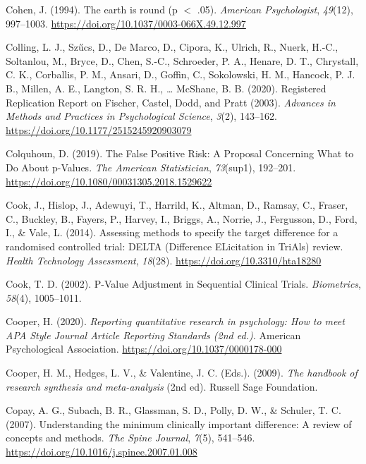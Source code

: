\documentclass[
  oneside]{krantz}
\newlength{\cslhangindent}
\newlength{\cslentryspacingunit} %
\newenvironment{CSLReferences}[2] %
 {%
  \setlength{\parindent}{0pt}
  \ifodd #1
  \let\oldpar\par
  \def\par{\hangindent=\cslhangindent\oldpar}
  \fi
  \setlength{\parskip}{#2\cslentryspacingunit}
 }%
 {}
\begin{document}
\begin{CSLReferences}{1}{0}
\leavevmode{}%
Cohen, J. (1994). The earth is round (p {\(<\)} .05). \emph{American
Psychologist}, \emph{49}(12), 997--1003.
\url{https://doi.org/10.1037/0003-066X.49.12.997}

\leavevmode{}%
Colling, L. J., Szűcs, D., De Marco, D., Cipora, K., Ulrich, R., Nuerk,
H.-C., Soltanlou, M., Bryce, D., Chen, S.-C., Schroeder, P. A., Henare,
D. T., Chrystall, C. K., Corballis, P. M., Ansari, D., Goffin, C.,
Sokolowski, H. M., Hancock, P. J. B., Millen, A. E., Langton, S. R. H.,
\ldots{} McShane, B. B. (2020). Registered {Replication Report} on
{Fischer}, {Castel}, {Dodd}, and {Pratt} (2003). \emph{Advances in
Methods and Practices in Psychological Science}, \emph{3}(2), 143--162.
\url{https://doi.org/10.1177/2515245920903079}

\leavevmode{}%
Colquhoun, D. (2019). The {False Positive Risk}: {A Proposal Concerning
What} to {Do About} p-{Values}. \emph{The American Statistician},
\emph{73}(sup1), 192--201.
\url{https://doi.org/10.1080/00031305.2018.1529622}

\leavevmode{}%
Cook, J., Hislop, J., Adewuyi, T., Harrild, K., Altman, D., Ramsay, C.,
Fraser, C., Buckley, B., Fayers, P., Harvey, I., Briggs, A., Norrie, J.,
Fergusson, D., Ford, I., \& Vale, L. (2014). Assessing methods to
specify the target difference for a randomised controlled trial: {DELTA}
({Difference ELicitation} in {TriAls}) review. \emph{Health Technology
Assessment}, \emph{18}(28). \url{https://doi.org/10.3310/hta18280}

\leavevmode{}%
Cook, T. D. (2002). P-{Value Adjustment} in {Sequential Clinical
Trials}. \emph{Biometrics}, \emph{58}(4), 1005--1011.

\leavevmode{}%
Cooper, H. (2020). \emph{Reporting quantitative research in psychology:
{How} to meet {APA Style Journal Article Reporting Standards} (2nd
ed.).} {American Psychological Association}.
\url{https://doi.org/10.1037/0000178-000}

\leavevmode{}%
Cooper, H. M., Hedges, L. V., \& Valentine, J. C. (Eds.). (2009).
\emph{The handbook of research synthesis and meta-analysis} (2nd ed).
{Russell Sage Foundation}.

\leavevmode{}%
Copay, A. G., Subach, B. R., Glassman, S. D., Polly, D. W., \& Schuler,
T. C. (2007). Understanding the minimum clinically important difference:
A review of concepts and methods. \emph{The Spine Journal}, \emph{7}(5),
541--546. \url{https://doi.org/10.1016/j.spinee.2007.01.008}


\end{CSLReferences}
\end{document}
